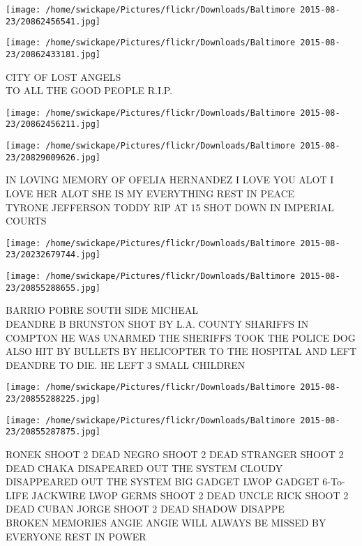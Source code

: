 \documentclass[10pt,letterpaper]{article}
\begin{document}
\texttt{[image: /home/swickape/Pictures/flickr/Downloads/Baltimore 2015-08-23/20862456541.jpg]}

\vspace{0.25in}
\texttt{[image: /home/swickape/Pictures/flickr/Downloads/Baltimore 2015-08-23/20862433181.jpg]}

CITY OF LOST ANGELS\\
TO ALL THE GOOD PEOPLE R.I.P.
\pagebreak

\texttt{[image: /home/swickape/Pictures/flickr/Downloads/Baltimore 2015-08-23/20862456211.jpg]}

\vspace{0.25in}
\texttt{[image: /home/swickape/Pictures/flickr/Downloads/Baltimore 2015-08-23/20829009626.jpg]}

IN LOVING MEMORY OF OFELIA HERNANDEZ I LOVE YOU ALOT I LOVE HER ALOT SHE IS MY EVERYTHING REST IN PEACE\\
TYRONE JEFFERSON TODDY RIP AT 15 SHOT DOWN IN IMPERIAL COURTS
\pagebreak

\texttt{[image: /home/swickape/Pictures/flickr/Downloads/Baltimore 2015-08-23/20232679744.jpg]}

\vspace{0.25in}
\texttt{[image: /home/swickape/Pictures/flickr/Downloads/Baltimore 2015-08-23/20855288655.jpg]}

BARRIO POBRE SOUTH SIDE MICHEAL\\
DEANDRE B BRUNSTON SHOT BY L.A. COUNTY SHARIFFS IN COMPTON HE WAS UNARMED THE SHERIFFS TOOK THE POLICE DOG ALSO HIT BY BULLETS BY HELICOPTER TO THE HOSPITAL AND LEFT DEANDRE TO DIE.  HE LEFT 3 SMALL CHILDREN
\pagebreak

\texttt{[image: /home/swickape/Pictures/flickr/Downloads/Baltimore 2015-08-23/20855288225.jpg]}

\vspace{0.25in}
\texttt{[image: /home/swickape/Pictures/flickr/Downloads/Baltimore 2015-08-23/20855287875.jpg]}

RONEK SHOOT 2 DEAD NEGRO SHOOT 2 DEAD STRANGER SHOOT 2 DEAD CHAKA DISAPEARED OUT THE SYSTEM CLOUDY DISAPPEARED OUT THE SYSTEM BIG GADGET LWOP GADGET 6{-}To{-}LIFE JACKWIRE LWOP GERMS SHOOT 2 DEAD UNCLE RICK SHOOT 2 DEAD CUBAN JORGE SHOOT 2 DEAD SHADOW DISAPPE\\
BROKEN MEMORIES ANGIE ANGIE WILL ALWAYS BE MISSED BY EVERYONE REST IN POWER
\pagebreak
\end{document}
